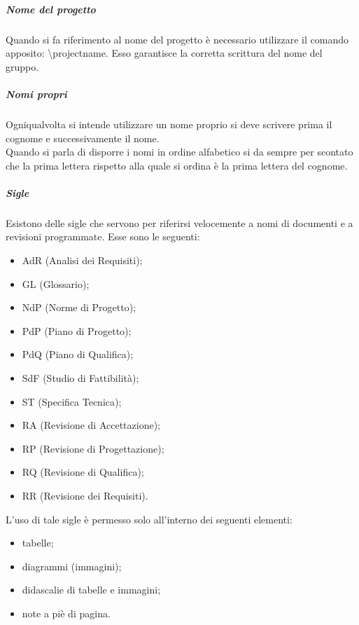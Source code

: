 				\subparagraph{Nome del progetto}
					Quando si fa riferimento al nome del progetto è necessario utilizzare il comando \latex{} apposito: \textbackslash projectname{}. Esso garantisce la corretta scrittura del nome del gruppo.
				\subparagraph{Nomi propri}
					Ogniqualvolta si intende utilizzare un nome proprio si deve scrivere prima il cognome e successivamente il nome.\\
					Quando si parla di disporre i nomi in ordine alfabetico si da sempre per scontato che la prima lettera rispetto alla quale si ordina è la prima lettera del cognome.
				\subparagraph{Sigle}
					Esistono delle sigle che servono per riferirsi velocemente a nomi di documenti e a revisioni programmate. Esse sono le seguenti:
					\begin{itemize}
						\item AdR (Analisi dei Requisiti);
						\item GL (Glossario);
						\item NdP (Norme di Progetto);
						\item PdP (Piano di Progetto);
						\item PdQ (Piano di Qualifica);
						\item SdF (Studio di Fattibilità);
						\item ST (Specifica Tecnica);
						\item RA (Revisione di Accettazione);
						\item RP (Revisione di Progettazione);
						\item RQ (Revisione di Qualifica);
						\item RR (Revisione dei Requisiti).
					\end{itemize}
					L’uso di tale sigle è permesso solo all’interno dei seguenti elementi:
					\begin{itemize}
						\item tabelle;
						\item diagrammi (immagini);
						\item didascalie di tabelle e immagini;
						\item note a piè di pagina.
					\end{itemize}
